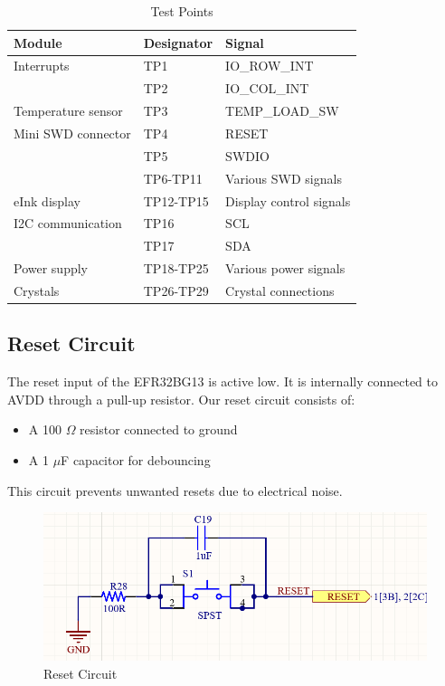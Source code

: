 \documentclass[a4paper,11pt]{article}%
\begin{document}
\begin{table}[H]
    \centering
    \begin{tabular}{|l|l|l|}
        \hline
        \textbf{Module} & \textbf{Designator} & \textbf{Signal} \\
        \hline
        Interrupts & TP1 & IO\_ROW\_INT \\
        & TP2 & IO\_COL\_INT \\
        \hline
        Temperature sensor & TP3 & TEMP\_LOAD\_SW \\
        \hline
        Mini SWD connector & TP4 & RESET \\
        & TP5 & SWDIO \\
        & TP6-TP11 & Various SWD signals \\
        \hline
        eInk display & TP12-TP15 & Display control signals \\
        \hline
        I2C communication & TP16 & SCL \\
        & TP17 & SDA \\
        \hline
        Power supply & TP18-TP25 & Various power signals \\
        \hline
        Crystals & TP26-TP29 & Crystal connections \\
        \hline
    \end{tabular}
    \caption{Test Points}
    \label{tab:test_points}
\end{table}

\subsection{Reset Circuit}

The reset input of the EFR32BG13 is active low. It is internally connected to AVDD through a pull-up resistor. Our reset circuit consists of:

\begin{itemize}
    \item A 100 $\Omega$ resistor connected to ground
    \item A 1 $\mu$F capacitor for debouncing
\end{itemize}

This circuit prevents unwanted resets due to electrical noise.

\begin{figure}[H]
    \centering
    \includegraphics[width=\textwidth]{figures/reset_circuit.png}
    \caption{Reset Circuit}
\end{figure}
\end{document}
